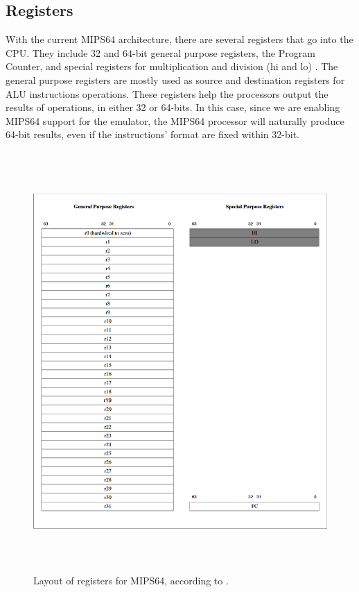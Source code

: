 \documentclass[
    paper=letter,
    parskip=half,
    fontsize=12pt,
    titlepage=firstiscover,
    toc=bibliography,
    numbers=endperiod
]{scrartcl}
\begin{document}
\subsection{Registers}
\label{subsec:mips64-registers}

With the current MIPS64 architecture, there are several registers that
go into the CPU. They include 32 and 64-bit general purpose registers,
the Program Counter, and special registers for multiplication and
division (hi and lo) \cite{mips-specification}. The general purpose
registers are mostly used as source and destination registers for ALU
instructions operations. These registers help the processors output the
results of operations, in either 32 or 64-bits. In this case, since we
are enabling MIPS64 support for the emulator, the MIPS64 processor will
naturally produce 64-bit results, even if the instructions' format are
fixed within 32-bit.

\begin{figure}[H]
    \includegraphics[height=16cm]{mips64-register-layout}
    \caption{Layout of registers for MIPS64, according to \protect\cite{mips-specification}.}
\end{figure}
\end{document}
